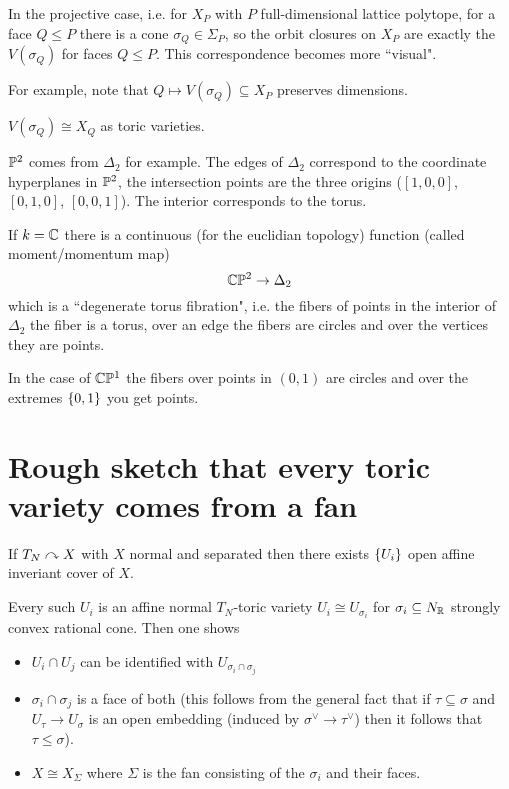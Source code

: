 In the projective case, i.e. for $X_P$ with $P$ full-dimensional lattice polytope, for a face $Q\leq P$ there is a cone $\sigma_Q\in \Sigma_P$, so the orbit closures on $X_P$ are exactly the $V(\sigma_Q)$ for faces $Q\leq P$. This correspondence becomes more ``visual".

For example, note that $Q\mapsto V(\sigma_Q)\subseteq X_P$ preserves dimensions.


\begin{proposition}[]
$V(\sigma_Q)\cong X_Q$ as toric varieties.
\end{proposition}

\begin{example}
$\mathbb{P}^2$ comes from $\Delta_2$ for example. The edges of $\Delta_2$ correspond to the coordinate hyperplanes in $\mathbb{P}^2$, the intersection points are the three origins ($[1,0,0]$, $[0,1,0]$, $[0,0,1]$). The interior corresponds to the torus.
\end{example}

\begin{remark}
If $k=\mathbb{C}$ there is a continuous (for the euclidian topology) function (called moment/momentum map)
\[\mathbb{C}\mathbb{P}^2\to \Delta_2\]
which is a ``degenerate torus fibration", i.e. the fibers of points in the interior of $\Delta_2$ the fiber is a torus, over an edge the fibers are circles and over the vertices they are points.


In the case of $\mathbb{C}\mathbb{P}^1$ the fibers over points in $(0,1)$ are circles and over the extremes $\left\{{0,1}\right\}$ you get points.
\end{remark}


\section{Rough sketch that every toric variety comes from a fan}

\begin{theorem}[Sumihiro]\label{ThSumihiros}
If $T_N\curvearrowright X$ with $X$ normal and separated then there exists $\left\{{U_i}\right\}$ open affine inveriant cover of $X$. 
\end{theorem}

Every such $U_i$ is an affine normal $T_N$-toric variety $U_i\cong U_{\sigma_i}$ for $\sigma_i\subseteq N_{\mathbb{R}}$ strongly convex rational cone. Then one shows
\begin{itemize}
	\item $U_i\cap U_j$ can be identified with $U_{\sigma_i\cap \sigma_j}$
	\item $\sigma_i\cap \sigma_j$ is a face of both (this follows from the general fact that if $\tau\subseteq \sigma$ and $U_\tau\to U_\sigma$ is an open embedding (induced by $\sigma^\vee\to \tau^\vee$) then it follows that $\tau\leq\sigma$).
	\item $X\cong X_\Sigma$ where $\Sigma$ is the fan consisting of the $\sigma_i$ and their faces.
\end{itemize}





